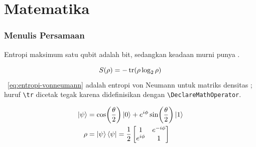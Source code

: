 \section{Matematika}

\begin{frame}
  \frametitle{Menulis Persamaan}

  Entropi maksimum satu qubit adalah  bit,
  sedangkan keadaan murni punya .

  \medskip
  \begin{equation}
    S(\rho) = -\operatorname{tr}\!\left(\rho \log_2 \rho\right)
    \label{eq:entropi-vonneumann}
  \end{equation}
  \equ~\ref{eq:entropi-vonneumann} adalah entropi von Neumann untuk matriks
  densitas \sel{\rho}; huruf \texttt{\textbackslash tr} dicetak tegak karena
  didefinisikan dengan \texttt{\textbackslash DeclareMathOperator}.

  \medskip
  \begin{align*}
    \ket{\psi} &= \cos\!\left(\frac{\theta}{2}\right)\ket{0}
                 + e^{i\phi}\sin\!\left(\frac{\theta}{2}\right)\ket{1} \\
    \rho &= \ket{\psi}\bra{\psi}
          = \frac{1}{2}
            \begin{bmatrix}
              1 & e^{-i\phi} \\
              e^{i\phi} & 1
            \end{bmatrix}
  \end{align*}

\end{frame}

